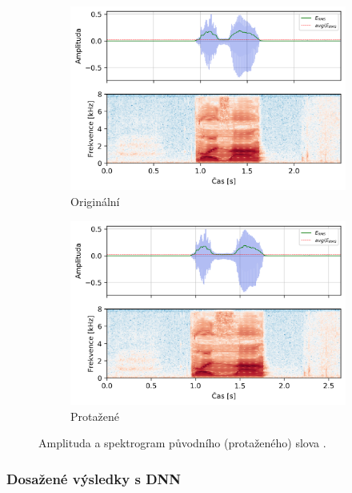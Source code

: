 \begin{figure}[htpb]
  \centering
  \begin{subfigure}[b]{0.42\textwidth}
    \includegraphics[width=\textwidth]{./ch5-construction/img/energy_spec_word-normal.png}
    \caption{Originální}
    \label{fig:realisation:augmentation:compare:original}
  \end{subfigure}
  \begin{subfigure}[b]{0.42\textwidth}
    \includegraphics[width=\textwidth]{./ch5-construction/img/energy_spec_word-augmented.png}
    \caption{Protažené}
    \label{fig:realisation:augmentation:compare:augmented}
  \end{subfigure}
  \caption{Amplituda a spektrogram původního (protaženého) slova .}
  \label{fig:realisation:augmentation:compare}
\end{figure}

\subsubsection{Dosažené výsledky s DNN}

